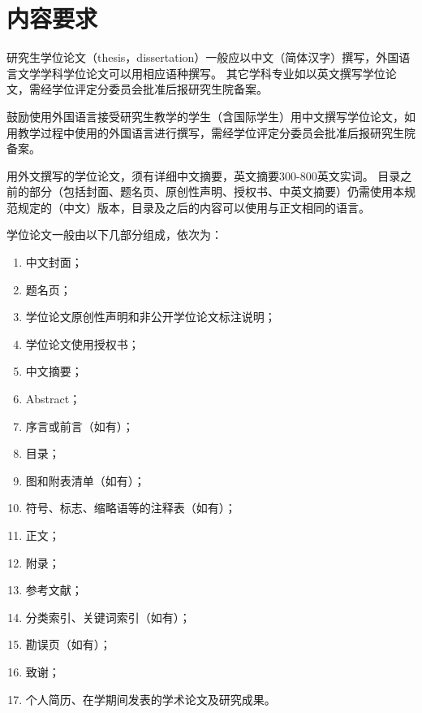 \chapter{内容要求}

研究生学位论文（thesis，dissertation）一般应以中文（简体汉字）撰写，外国语言文学学科学位论文可以用相应语种撰写。
其它学科专业如以英文撰写学位论文，需经学位评定分委员会批准后报研究生院备案。

鼓励使用外国语言接受研究生教学的学生（含国际学生）用中文撰写学位论文，如用教学过程中使用的外国语言进行撰写，需经学位评定分委员会批准后报研究生院备案。

用外文撰写的学位论文，须有详细中文摘要，英文摘要300-800英文实词。
目录之前的部分（包括封面、题名页、原创性声明、授权书、中英文摘要）仍需使用本规范规定的（中文）版本，目录及之后的内容可以使用与正文相同的语言。

学位论文一般由以下几部分组成，依次为：

\begin{enumerate}
    \item 中文封面；
    \item 题名页；
    \item 学位论文原创性声明和非公开学位论文标注说明；
    \item 学位论文使用授权书；
    \item 中文摘要；
    \item Abstract；
    \item 序言或前言（如有）；
    \item 目录；
    \item 图和附表清单（如有）；
    \item 符号、标志、缩略语等的注释表（如有）；
    \item 正文；
    \item 附录；
    \item 参考文献；
    \item 分类索引、关键词索引（如有）；
    \item 勘误页（如有）；
    \item 致谢；
    \item 个人简历、在学期间发表的学术论文及研究成果。
\end{enumerate}
